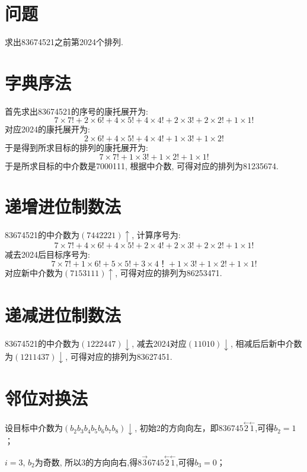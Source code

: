 \documentclass[UTF8,oneside]{article}
\begin{document}
\fontsize{12pt}{24pt}

\section{问题} 求出83674521之前第2024个排列.

\section{字典序法}

首先求出83674521的序号的康托展开为:
\[
    7 \times 7! + 2 \times 6! + 4 \times 5! + 4\times 4! + 2\times 3! + 2\times 2! + 1\times 1!
\]
对应2024的康托展开为:
\[
    2 \times 6! + 4\times 5! + 4\times 4! + 1 \times 3! + 1\times 2!
\]
于是得到所求目标的排列的康托展开为:
\[
    7 \times 7! + 1\times 3! + 1\times 2! + 1\times 1!
\]
于是所求目标的中介数是7000111, 根据中介数, 可得对应的排列为81235674.

\section{递增进位制数法}

83674521的中介数为$(7442221)\uparrow$, 计算序号为:
\[
    7 \times 7! + 4\times 6! + 4\times 5! + 2\times 4! + 2\times 3! + 2\times 2! + 1\times 1!
\]
减去2024后目标序号为:
\[
    7 \times 7! + 1\times 6! + 5\times 5! + 3\times 4！ + 1\times 3! + 1\times 2! + 1\times 1!
\]
对应新中介数为$(7153111)\uparrow$, 可得对应的排列为86253471.

\section{递减进位制数法}

83674521的中介数为$(1222447)\downarrow$, 减去2024对应$(11010)\downarrow$, 相减后后新中介数为$(1211437)\downarrow$, 可得对应的排列为83627451.

\section{邻位对换法}

设目标中介数为$(b_2b_3b_4b_5b_6b_7b_8)\downarrow$, 初始2的方向向左，即$
    \overset{}{8}\overset{}{3}\overset{}{6}\overset{}{7}\overset{}{4}\overset{}{5}\overset{\leftarrow}{2}\overset{\leftarrow}{1}
$,可得$b_2=1$；

$i=3$, $b_2$为奇数, 所以3的方向向右,得$
    \overset{}{8}\overset{\rightarrow}{3}\overset{}{6}\overset{}{7}\overset{}{4}\overset{}{5}\overset{\leftarrow}{2}\overset{\leftarrow}{1}
$,可得$b_3=0$；
\end{document}

